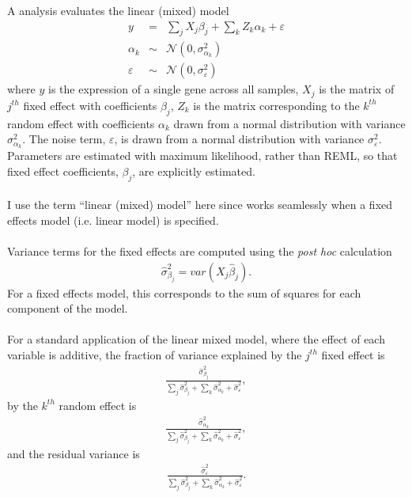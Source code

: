 \documentclass[12pt]{article}\usepackage[]{graphicx}\usepackage[]{xcolor}
\begin{document}
A  analysis evaluates the linear (mixed) model
\begin{eqnarray}
  y &=& \sum_j X_j\beta_j + \sum_k Z_k \alpha_k + \varepsilon \\
  \alpha_k &\sim& \mathcal{N}(0, \sigma^2_{\alpha_k})\\
  \varepsilon &\sim& \mathcal{N}(0, \sigma^2_\varepsilon)
\end{eqnarray}
where $y$ is the expression of a single gene across all samples, $X_j$ is the matrix of $j^{th}$ fixed effect with coefficients $\beta_j$, $Z_k$ is the matrix corresponding to the $k^{th}$ random effect with coefficients $\alpha_k$ drawn from a normal distribution with variance $\sigma^2_{\alpha_k}$.  The noise term, $\varepsilon$, is drawn from a normal distribution with variance $\sigma^2_\varepsilon$.  Parameters are estimated with maximum likelihood, rather than REML, so that fixed effect coefficients, $\beta_j$, are explicitly estimated. \\  
\\
I use the term ``linear (mixed) model'' here since  works seamlessly when a fixed effects model (i.e. linear model) is specified.\\
\\
Variance terms for the fixed effects are computed using the {\it post hoc} calculation  
\begin{eqnarray}
 \hat{\sigma}^2_{\beta_j} = var( X_j \hat{\beta}_j).
\end{eqnarray}
For a fixed effects model, this corresponds to the sum of squares for each component of the model.\\
\\
For a standard application of the linear mixed model, where the effect of each variable is additive, the fraction of variance explained by the $j^{th}$ fixed effect is
\begin{eqnarray}
 \frac{\hat{\sigma}^2_{\beta_j}}{\sum_j \hat{\sigma}^2_{\beta_j} + \sum_k \hat{\sigma}^2_{\alpha_k} + \hat{\sigma}^2_\varepsilon},
\end{eqnarray}
by the $k^{th}$ random effect is 
\begin{eqnarray}
 \frac{\hat{\sigma}^2_{\alpha_k}}{\sum_j \hat{\sigma}^2_{\beta_j} + \sum_k \hat{\sigma}^2_{\alpha_k} + \hat{\sigma}^2_\varepsilon},
 \end{eqnarray}
and the residual variance is 
\begin{eqnarray}
 \frac{\hat{\sigma}^2_{\varepsilon}}{\sum_j \hat{\sigma}^2_{\beta_j} + \sum_k \hat{\sigma}^2_{\alpha_k} + \hat{\sigma}^2_\varepsilon}.
 \end{eqnarray}
\end{document}
